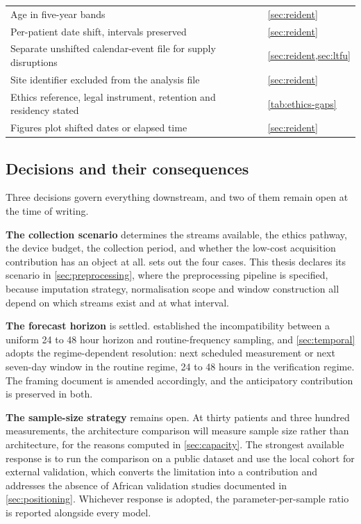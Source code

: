 \documentclass[12pt,a4paper,oneside]{report}
\begin{document}
\begin{table}[htbp]
\begin{tabularx}{\textwidth}{@{}X >{\raggedright\arraybackslash}p{5.5cm}@{}}
Age in five-year bands & \cref{sec:reident} \\
Per-patient date shift, intervals preserved & \cref{sec:reident} \\
Separate unshifted calendar-event file for supply disruptions & \cref{sec:reident,sec:ltfu} \\
Site identifier excluded from the analysis file & \cref{sec:reident} \\
Ethics reference, legal instrument, retention and residency stated & \cref{tab:ethics-gaps} \\
Figures plot shifted dates or elapsed time & \cref{sec:reident} \\
\bottomrule
\end{tabularx}
\end{table}

\subsection{Decisions and their consequences}\label{sec:decisions}

Three decisions govern everything downstream, and two of them remain open at the time of writing.

\textbf{The collection scenario} determines the streams available, the ethics pathway, the device budget, the collection period, and whether the low-cost acquisition contribution has an object at all.  sets out the four cases. This thesis declares its scenario in \cref{sec:preprocessing}, where the preprocessing pipeline is specified, because imputation strategy, normalisation scope and window construction all depend on which streams exist and at what interval.

\textbf{The forecast horizon} is settled.  established the incompatibility between a uniform 24 to 48 hour horizon and routine-frequency sampling, and \cref{sec:temporal} adopts the regime-dependent resolution: next scheduled measurement or next seven-day window in the routine regime, 24 to 48 hours in the verification regime. The framing document is amended accordingly, and the anticipatory contribution is preserved in both.

\textbf{The sample-size strategy} remains open. At thirty patients and three hundred measurements, the architecture comparison will measure sample size rather than architecture, for the reasons computed in \cref{sec:capacity}. The strongest available response is to run the comparison on a public dataset and use the local cohort for external validation, which converts the limitation into a contribution and addresses the absence of African validation studies documented in \cref{sec:positioning}. Whichever response is adopted, the parameter-per-sample ratio is reported alongside every model.
\end{document}
